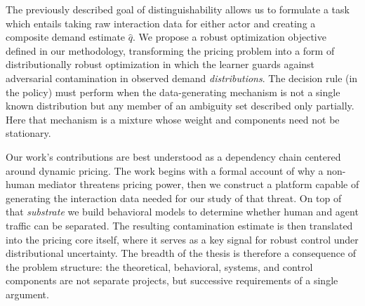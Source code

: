 The previously described goal of distinguishability allows us to formulate a task which entails taking raw interaction data for either actor and creating a composite demand estimate $\hat{q}$. We propose a robust optimization objective defined in our methodology, transforming the pricing problem into a form of distributionally robust optimization \parencite{kuhn_distributionally_2025} in which the learner guards against adversarial contamination in observed demand \emph{distributions}. The decision rule (in the policy) must perform when the data-generating mechanism is not a single known distribution but any member of an ambiguity set described only partially. Here that mechanism is a mixture whose weight and components need not be stationary.

Our work's contributions are best understood as a dependency chain centered around dynamic pricing. The work begins with a formal account of why a non-human mediator threatens pricing power, then we construct a platform capable of generating the interaction data needed for our study of that threat. On top of that \textit{substrate} we build behavioral models to determine whether human and agent traffic can be separated. The resulting contamination estimate is then translated into the pricing core itself, where it serves as a key signal for robust control under distributional uncertainty. The breadth of the thesis is therefore a consequence of the problem structure: the theoretical, behavioral, systems, and control components are not separate projects, but successive requirements of a single argument.
